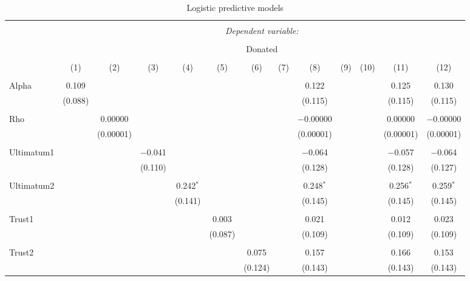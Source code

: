\documentclass[12pt]{article}
\begin{document}
\begin{table}[!htbp] \centering 
  \caption{Logistic predictive models} 
  \label{} 
     \begin{adjustbox}{width=\textwidth}
\begin{tabular}{@{\extracolsep{5pt}}lcccccccccccc} 
\\[-1.8ex]\hline 
\hline \\[-1.8ex] 
 & \multicolumn{12}{c}{\textit{Dependent variable:}} \\ 
\cline{2-13} 
\\[-1.8ex] & \multicolumn{12}{c}{Donated} \\ 
\\[-1.8ex] & (1) & (2) & (3) & (4) & (5) & (6) & (7) & (8) & (9) & (10) & (11) & (12)\\ 
\hline \\[-1.8ex] 
 Alpha & 0.109 &  &  &  &  &  &  & 0.122 &  &  & 0.125 & 0.130 \\ 
  & (0.088) &  &  &  &  &  &  & (0.115) &  &  & (0.115) & (0.115) \\ 
  & & & & & & & & & & & & \\ 
 Rho &  & 0.00000 &  &  &  &  &  & $-$0.00000 &  &  & 0.00000 & $-$0.00000 \\ 
  &  & (0.00001) &  &  &  &  &  & (0.00001) &  &  & (0.00001) & (0.00001) \\ 
  & & & & & & & & & & & & \\ 
 Ultimatum1 &  &  & $-$0.041 &  &  &  &  & $-$0.064 &  &  & $-$0.057 & $-$0.064 \\ 
  &  &  & (0.110) &  &  &  &  & (0.128) &  &  & (0.128) & (0.127) \\ 
  & & & & & & & & & & & & \\ 
 Ultimatum2 &  &  &  & 0.242$^{*}$ &  &  &  & 0.248$^{*}$ &  &  & 0.256$^{*}$ & 0.259$^{*}$ \\ 
  &  &  &  & (0.141) &  &  &  & (0.145) &  &  & (0.145) & (0.145) \\ 
  & & & & & & & & & & & & \\ 
 Trust1 &  &  &  &  & 0.003 &  &  & 0.021 &  &  & 0.012 & 0.023 \\ 
  &  &  &  &  & (0.087) &  &  & (0.109) &  &  & (0.109) & (0.109) \\ 
  & & & & & & & & & & & & \\ 
 Trust2 &  &  &  &  &  & 0.075 &  & 0.157 &  &  & 0.166 & 0.153 \\ 
  &  &  &  &  &  & (0.124) &  & (0.143) &  &  & (0.143) & (0.143) \\ 

\end{tabular}
\end{adjustbox}
\end{table}
\end{document}
